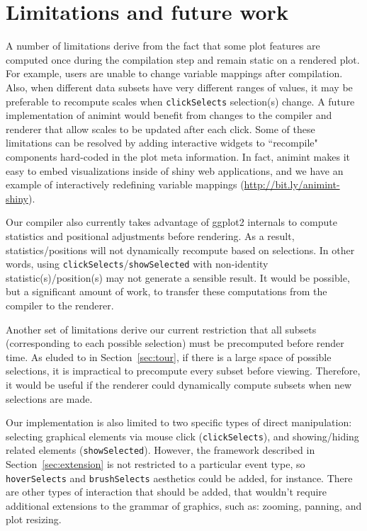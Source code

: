 \documentclass[journal]{vgtc}\usepackage[]{graphicx}\usepackage[]{color}
\begin{document}
\section{Limitations and future work}
\label{sec:limitations}


A number of limitations derive from the fact that some plot features
are computed once during the compilation step and remain static on a
rendered plot. For example, users are unable to change variable
mappings after compilation.
Also, when different data subsets have very different ranges of
values, it may be preferable to recompute scales when
\texttt{clickSelects} selection(s) change. A future
implementation of animint would benefit from changes to the compiler
and renderer that allow scales to be updated after each click. Some 
of these limitations can be resolved by adding interactive widgets
to ``recompile" components hard-coded in the plot meta information.
In fact, animint makes it easy to embed visualizations inside of
shiny web applications, and we have an example of interactively
redefining variable mappings (\url{http://bit.ly/animint-shiny}).

Our compiler also currently takes advantage of ggplot2 internals to compute 
statistics and positional adjustments before rendering. As a result,
statistics/positions will not dynamically recompute based on selections.
In other words, using \texttt{clickSelects}/\texttt{showSelected} with 
non-identity statistic(s)/position(s) may not generate a sensible result. 
It would be possible, but a significant amount of work, to transfer these 
computations from the compiler to the renderer.

Another set of limitations derive our current restriction that all 
subsets (corresponding to each possible selection) must be precomputed
before render time. As eluded to in Section~\ref{sec:tour},
if there is a large space of possible selections,
it is impractical to precompute every subset before viewing.
Therefore, it would be useful if the renderer could
dynamically compute subsets when new selections are made. 

Our implementation is also limited to two specific types of
direct manipulation: selecting graphical elements via
mouse click (\texttt{clickSelects}), and showing/hiding related 
elements (\texttt{showSelected}). However, the framework described in 
Section~\ref{sec:extension} is not restricted to a particular event type, 
so \texttt{hoverSelects} and \texttt{brushSelects} aesthetics could be 
added, for instance. There are other types of interaction that should be
added, that wouldn't require additional extensions to the grammar of graphics,
such as: zooming, panning, and plot resizing.
\end{document}
